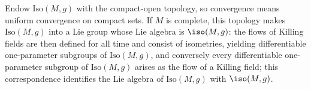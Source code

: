 \begin{lemma}
  \label{lem:pet-ch8-killing-flow-oneparameter-subgroup}
  Endow $\mathrm{Iso}(M,g)$ with the compact-open topology, so convergence means
  uniform convergence on compact sets. If $M$ is complete, this topology makes
  $\mathrm{Iso}(M,g)$ into a Lie group whose Lie algebra is $\iso(M,g)$: the
  flows of Killing fields are then defined for all time and consist of
  isometries, yielding differentiable one-parameter subgroups of
  $\mathrm{Iso}(M,g)$, and conversely every differentiable one-parameter
  subgroup of $\mathrm{Iso}(M,g)$ arises as the flow of a Killing field; this
  correspondence identifies the Lie algebra of $\mathrm{Iso}(M,g)$ with
  $\iso(M,g)$.
\end{lemma}
